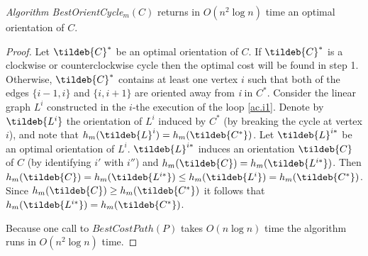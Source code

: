 \bigskip
\begin{theorem}\label{t.cycle-m}
\emph{Algorithm BestOrientCycle}$_m(C)$ returns in $O(n^2 \log n)$ time an optimal 
orientation of $C$.
\end{theorem}
\begin{proof}

Let $\tildeb{C}^*$ be an optimal orientation 
of $C$.
If $\tildeb{C}^*$ is a clockwise or counterclockwise cycle then the optimal cost will be found in step 1.
Otherwise, $\tildeb{C}^*$ contains at least one vertex $i$ such that both of the edges $\{i-1,i\}$ and $\{i,i+1\}$
are oriented away from \textit{i} in $C^*$.  Consider the linear graph $L^i$ constructed in
the $i$-the execution of the loop \ref{ac.i1}. Denote by $\tildeb{L^i}$ the orientation of $L^i$ 
induced by $C^*$  (by breaking the cycle at vertex $i$), and note that 
$h_m(\tildeb{L}^i)=h_m(\tildeb{C^*})$. Let $\tildeb{L}^{i*}$ be an optimal orientation of $L^i$.
$\tildeb{L}^{i*}$ induces an orientation $\tildeb{C}$ of $C$ (by identifying $i'$ with $i''$)
and $h_m(\tildeb{C})=h_m(\tildeb{L^{i*}})$.  
Then $h_m(\tildeb{C})=h_m(\tildeb{L^{i*}})\leq h_m(\tildeb{L^i})=h_m(\tildeb{C^*})$.
Since $h_m(\tildeb{C})\geq h_m(\tildeb{C^*})$ it follows that $h_m(\tildeb{L^{i*}})= h_m(\tildeb{C^*})$.

Because one call to $BestCostPath(P)$ takes $O(n \log n)$ time the algorithm runs in $O(n^2 \log n)$ time.
\end{proof}